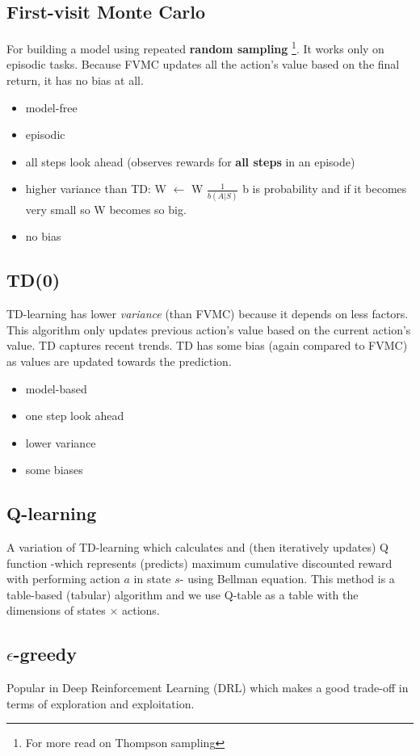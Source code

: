 \documentclass[letterpaper,12pt]{article}
\begin{document}
    \subsection{First-visit Monte Carlo}
    For building a model using repeated \textbf{random sampling} \footnote{For more read on Thompson sampling}. It works only on episodic tasks. Because FVMC updates all the action's value based on the final return, it has no bias at all.
    \begin{itemize}
        \item model-free
        \item episodic
        \item  all steps look ahead (observes rewards for \textbf{all steps} in an episode)
        \item higher variance than TD: W $\leftarrow$ W $\frac{1}{b(A|S)}$ b is probability and if it becomes very small so W becomes so big.
        \item no bias
    \end{itemize}

    \subsection{TD(0)}
    TD-learning has lower \textit{variance} (than FVMC) because it depends on less factors. This algorithm only updates previous action's value based on the current action's value. TD captures recent trends. TD has some bias (again compared to FVMC) as values are updated towards the prediction.
    \begin{itemize}
        \item model-based
        \item one step look ahead
        \item lower variance
        \item some biases
    \end{itemize}

    \subsection{Q-learning}
    A variation of TD-learning which calculates and (then iteratively updates) Q function -which represents (predicts) maximum cumulative discounted reward with performing action $a$ in state $s$- using Bellman equation. This method is a table-based (tabular) algorithm and we use Q-table as a table with the dimensions of states $\times$ actions.

    \subsection{$\epsilon$-greedy}
    Popular in Deep Reinforcement Learning (DRL) which makes a good trade-off in terms of exploration and exploitation.
\end{document}
